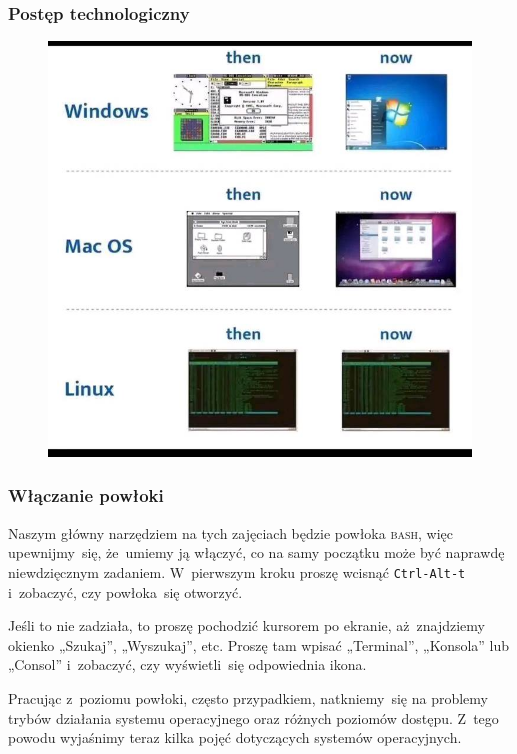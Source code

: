 \documentclass[10pt,t]{beamer}
\begin{document}
\begin{frame}
  \frametitle{Postęp technologiczny}

  \vspace{-0.5em}


  \begin{figure}

    \label{fig:Evolution-of-OS}

    \centering


    \includegraphics[scale=0.3]
    {./Presentations-pictures/Miscancellous-pictures/Evolution-of-operating-systems.jpg}

  \end{figure}

\end{frame}





\begin{frame}
  \frametitle{Włączanie powłoki}


  Naszym główny narzędziem na tych zajęciach będzie powłoka \textsc{bash},
  więc upewnijmy~się, że~umiemy ją włączyć, co na samy początku może być
  naprawdę niewdzięcznym zadaniem. W~pierwszym kroku proszę wcisnąć
  \texttt{Ctrl-Alt-t} i~zobaczyć, czy powłoka~się otworzyć.

  Jeśli to nie zadziała, to proszę pochodzić kursorem po ekranie,
  aż~znajdziemy okienko „Szukaj”, „Wyszukaj”, etc. Proszę tam wpisać
  „Terminal”, „Konsola” lub „Consol” i~zobaczyć, czy wyświetli~się
  odpowiednia ikona.

  Pracując z~poziomu powłoki, często przypadkiem, natkniemy~się na problemy
  trybów działania systemu operacyjnego oraz różnych poziomów dostępu.
  Z~tego powodu wyjaśnimy teraz kilka pojęć dotyczących systemów
  operacyjnych.

\end{frame}
\end{document}
